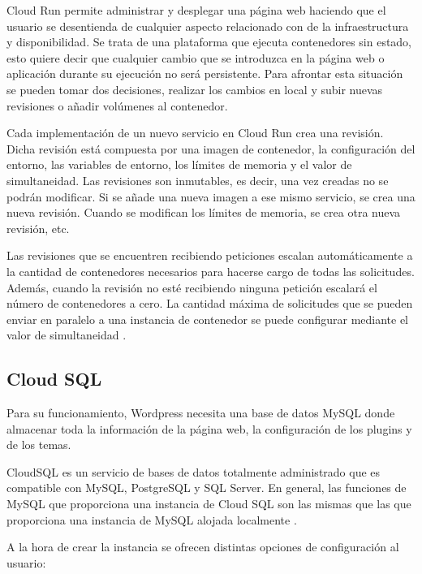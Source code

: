 Cloud Run permite administrar y desplegar una página web haciendo que el usuario se desentienda de cualquier aspecto relacionado con de la infraestructura y disponibilidad. Se trata de una plataforma que ejecuta contenedores sin estado, esto quiere decir que cualquier cambio que se introduzca en la página web o aplicación durante su ejecución no será persistente. Para afrontar esta situación se pueden tomar dos decisiones, realizar los cambios en local y subir nuevas revisiones o añadir volúmenes al contenedor. 

Cada implementación de un nuevo servicio en Cloud Run crea una revisión. Dicha revisión está compuesta por una imagen de contenedor, la configuración del entorno, las variables de entorno, los límites de memoria y el valor de simultaneidad. Las revisiones son inmutables, es decir, una vez creadas no se podrán modificar. Si se añade una nueva imagen a ese mismo servicio, se crea una nueva revisión. Cuando se modifican los límites de memoria, se crea otra nueva revisión, etc.

Las revisiones que se encuentren recibiendo peticiones escalan automáticamente a la cantidad de contenedores necesarios para hacerse cargo de todas las solicitudes. Además, cuando la revisión no esté recibiendo ninguna petición escalará el número de contenedores a cero. La cantidad máxima de solicitudes que se pueden enviar en paralelo a una instancia de contenedor se puede configurar mediante el valor de simultaneidad . 

\subsection{Cloud SQL}
Para su funcionamiento, Wordpress necesita una base de datos MySQL donde almacenar toda la información de la página web, la configuración de los plugins y de los temas.

CloudSQL es un servicio de bases de datos totalmente administrado que es compatible con MySQL, PostgreSQL y SQL Server. En general, las funciones de MySQL que proporciona una instancia de Cloud SQL son las mismas que las que proporciona una instancia de MySQL alojada localmente . 

A la hora de crear la instancia se ofrecen distintas opciones de configuración al usuario:

